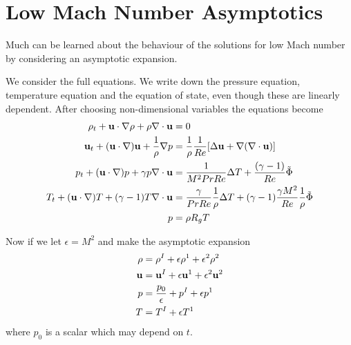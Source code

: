 \documentclass{article}
\begin{document}
\section{Low Mach Number Asymptotics}


Much can be learned about the behaviour of the solutions for low Mach number by considering 
an asymptotic expansion.

We consider the full equations. We write down the pressure equation, temperature equation
and the equation of state, even though these are linearly dependent. After choosing non-dimensional
variables the equations become
\begin{align*}
   \rho_t + {\bf u}\cdot\nabla\rho + \rho\nabla\cdot{\bf u} &= 0 \\
   {\bf u}_t + ({\bf u}\cdot\nabla){\bf u} + {1\over\rho}\nabla p &= {1\over\rho} {1\over Re} [\Delta {\bf u} + \nabla(\nabla\cdot{\bf u}) ] \\
   p_t + ({\bf u}\cdot\nabla) p + \gamma p \nabla\cdot{\bf u} &= 
           {1 \over M^2 Pr Re}  \Delta{T} +{(\gamma-1)\over Re} \tilde{\Phi}    \\
   T_t + ({\bf u}\cdot\nabla) T +(\gamma-1) T \nabla\cdot{\bf u}
       &= {\gamma \over Pr Re} { 1 \over \rho } \Delta T
       + (\gamma-1) { \gamma M^2 \over Re} {1\over \rho } \tilde{\Phi}               \\
   p &= \rho R_g T
\end{align*}


\newcommand{\eps}{\epsilon}

Now if we let $\eps = M^2$ and make the asymptotic expansion
\begin{align*}
    \rho &= \rho^I + \eps \rho^1 + \eps^2 \rho^2 \\
    \uv  &= \uv^I  + \eps \uv^1  + \eps^2 \uv^2 \\
    p   &= {p_0\over\eps} + p^I  + \eps p^1 \\
    T   &= T^I + \eps T^1 
\end{align*}
where $p_0$ is a scalar which may depend on $t$.
\end{document}
